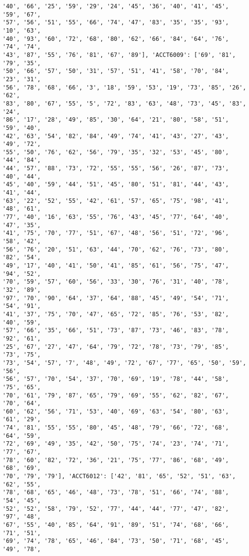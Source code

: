 \documentclass[11pt]{article}
\begin{document}
\begin{Verbatim}[commandchars=\\\{\}]
'40', '66', '25', '59', '29', '24', '45', '36', '40', '41', '45', '59', '67',
'57', '56', '51', '55', '66', '74', '47', '83', '35', '35', '93', '10', '63',
'40', '93', '60', '72', '68', '80', '62', '66', '84', '64', '76', '74', '74',
'43', '87', '55', '76', '81', '67', '89'], 'ACCT6009': ['69', '81', '79', '35',
'50', '66', '57', '50', '31', '57', '51', '41', '58', '70', '84', '23', '31',
'56', '78', '68', '66', '3', '18', '59', '53', '19', '73', '85', '26', '62',
'83', '80', '67', '55', '5', '72', '83', '63', '48', '73', '45', '83', '24',
'86', '17', '28', '49', '85', '30', '64', '21', '80', '58', '51', '59', '40',
'42', '63', '54', '82', '84', '49', '74', '41', '43', '27', '43', '49', '72',
'55', '50', '76', '62', '56', '79', '35', '32', '53', '45', '80', '44', '84',
'44', '57', '88', '73', '72', '55', '55', '56', '26', '87', '73', '40', '44',
'45', '40', '59', '44', '51', '45', '80', '51', '81', '44', '43', '41', '44',
'63', '22', '52', '55', '42', '61', '57', '65', '75', '98', '41', '48', '61',
'77', '40', '16', '63', '55', '76', '43', '45', '77', '64', '40', '47', '35',
'41', '75', '70', '77', '51', '67', '48', '56', '51', '72', '96', '58', '42',
'56', '76', '20', '51', '63', '44', '70', '62', '76', '73', '80', '82', '54',
'49', '17', '40', '41', '50', '41', '85', '61', '56', '75', '47', '94', '52',
'70', '59', '57', '60', '56', '33', '30', '76', '31', '40', '78', '32', '89',
'97', '70', '90', '64', '37', '64', '88', '45', '49', '54', '71', '54', '91',
'41', '37', '75', '70', '47', '65', '72', '85', '76', '53', '82', '40', '59',
'57', '66', '35', '66', '51', '73', '87', '73', '46', '83', '78', '92', '61',
'25', '67', '27', '47', '64', '79', '72', '78', '73', '79', '85', '73', '75',
'73', '54', '57', '7', '48', '49', '72', '67', '77', '65', '50', '59', '56',
'56', '57', '70', '54', '37', '70', '69', '19', '78', '44', '58', '75', '65',
'70', '61', '79', '87', '65', '79', '69', '55', '62', '82', '67', '70', '64',
'60', '62', '56', '71', '53', '40', '69', '63', '54', '80', '63', '61', '29',
'74', '81', '55', '55', '80', '45', '48', '79', '66', '72', '68', '64', '59',
'72', '69', '49', '35', '42', '50', '75', '74', '23', '74', '71', '77', '67',
'78', '60', '82', '72', '36', '21', '75', '77', '86', '68', '49', '68', '69',
'70', '79', '79'], 'ACCT6012': ['42', '81', '65', '52', '51', '63', '62', '55',
'78', '68', '65', '46', '48', '73', '78', '51', '66', '74', '88', '54', '45',
'52', '52', '58', '79', '52', '77', '44', '44', '77', '47', '82', '97', '48',
'67', '55', '40', '85', '64', '91', '89', '51', '74', '68', '66', '71', '51',
'69', '74', '78', '65', '46', '84', '73', '50', '71', '68', '45', '49', '78',

\end{Verbatim}
\end{document}
